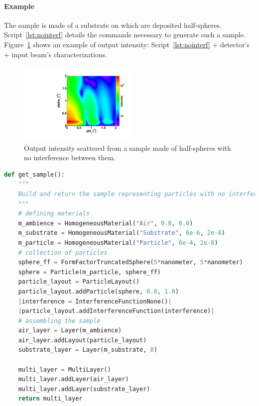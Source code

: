 \paragraph{Example} The sample is made of a substrate on which are deposited half-spheres. Script~\ref{lst:nointerf} details the commands necessary to generate such a sample. Figure~\ref{fig:nointerf} shows an example of output intensity: Script~\ref{lst:nointerf}  + detector's + input beam's characterizations.


\begin{figure}[tb]
\begin{center}
\includegraphics[angle=-90,width=0.5\textwidth]{fig/gisasmap/HSphere_NoInterf.pdf}
\end{center}
\caption{Output intensity scattered from a sample made of half-spheres with no interference between them.}
\label{fig:nointerf}
\end{figure}

\FloatBarrier
\newpage

\begin{lstlisting}[language=python, style=eclipseboxed,numbers=none,nolol,caption={\Code{Python} script to simulate a sample made of half-spheres deposited on a substrate layer without any interference. The part specific to the interferences is marked in a red italic font.},label={lst:nointerf}]
def get_sample():
    """
    Build and return the sample representing particles with no interference
    """
    # defining materials
    m_ambience = HomogeneousMaterial("Air", 0.0, 0.0)
    m_substrate = HomogeneousMaterial("Substrate", 6e-6, 2e-8)
    m_particle = HomogeneousMaterial("Particle", 6e-4, 2e-8)
    # collection of particles
    sphere_ff = FormFactorTruncatedSphere(5*nanometer, 5*nanometer)
    sphere = Particle(m_particle, sphere_ff)
    particle_layout = ParticleLayout()
    particle_layout.addParticle(sphere, 0.0, 1.0)
    |interference = InterferenceFunctionNone()| 
    |particle_layout.addInterferenceFunction(interference)|
    # assembling the sample
    air_layer = Layer(m_ambience)
    air_layer.addLayout(particle_layout)
    substrate_layer = Layer(m_substrate, 0)

    multi_layer = MultiLayer()
    multi_layer.addLayer(air_layer)
    multi_layer.addLayer(substrate_layer)
    return multi_layer
\end{lstlisting}

